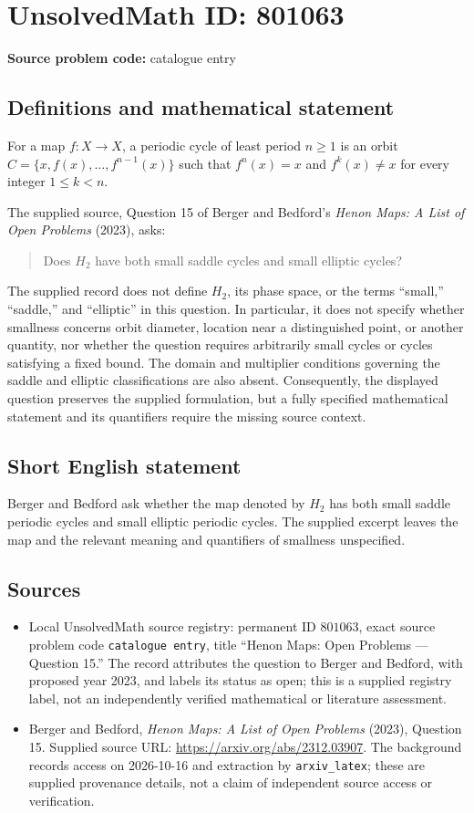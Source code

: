 \documentclass[11pt]{article}
\begin{document}
\section*{UnsolvedMath ID: 801063}
\textbf{Source problem code:} catalogue entry
\subsection{Definitions and mathematical statement}
For a map \(f\colon X\to X\), a periodic cycle of least period \(n\geq 1\) is an orbit \(C=\{x,f(x),\ldots,f^{n-1}(x)\}\) such that \(f^n(x)=x\) and \(f^k(x)\neq x\) for every integer \(1\leq k<n\).

The supplied source, Question 15 of Berger and Bedford's \emph{Henon Maps: A List of Open Problems} (2023), asks:
\begin{quote}
Does \(H_2\) have both small saddle cycles and small elliptic cycles?
\end{quote}
The supplied record does not define \(H_2\), its phase space, or the terms ``small,'' ``saddle,'' and ``elliptic'' in this question. In particular, it does not specify whether smallness concerns orbit diameter, location near a distinguished point, or another quantity, nor whether the question requires arbitrarily small cycles or cycles satisfying a fixed bound. The domain and multiplier conditions governing the saddle and elliptic classifications are also absent. Consequently, the displayed question preserves the supplied formulation, but a fully specified mathematical statement and its quantifiers require the missing source context.
\subsection{Short English statement}
Berger and Bedford ask whether the map denoted by \(H_2\) has both small saddle periodic cycles and small elliptic periodic cycles. The supplied excerpt leaves the map and the relevant meaning and quantifiers of smallness unspecified.
\subsection{Sources}
\begin{itemize}
\item Local UnsolvedMath source registry: permanent ID \(801063\), exact source problem code \texttt{catalogue entry}, title ``Henon Maps: Open Problems --- Question 15.'' The record attributes the question to Berger and Bedford, with proposed year 2023, and labels its status as open; this is a supplied registry label, not an independently verified mathematical or literature assessment.
\item Berger and Bedford, \emph{Henon Maps: A List of Open Problems} (2023), Question 15. Supplied source URL: \url{https://arxiv.org/abs/2312.03907}. The background records access on 2026-10-16 and extraction by \texttt{arxiv\_latex}; these are supplied provenance details, not a claim of independent source access or verification.
\end{itemize}
\end{document}

